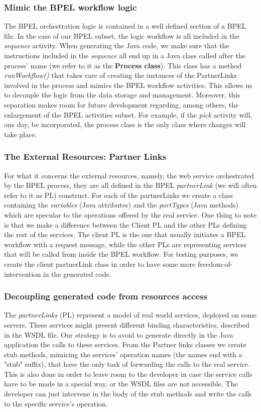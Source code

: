 \subsubsection{Mimic the BPEL workflow logic}
\label{mimicBPELLogic}
The BPEL orchestration logic is contained in a well defined section of a BPEL file. In the case of our BPEL subset, the logic workflow is all included in the \textit{sequence} activity. When generating the Java code, we make sure that the instructions included in the \textit{sequence} all end up in a Java class called after the process' name (we refer to it as the \textbf{Process class}). This class has a method \textit{runWorkflow()} that takes care of creating the instances of the PartnerLinks involved in the process and mimics the BPEL workflow activities.  
This allows us to decouple the logic from the data storage and management. Moreover, this separation makes room for future development regarding, among others, the enlargement of the BPEL activities subset. For example, if the \textit{pick} activity will, one day, be incorporated, the process class is the only class where changes will take place.

\subsubsection{The External Resources: Partner Links}
\label{sec:extrenalResources}
For what it concerns the external resources, namely, the web service orchestrated by the BPEL process, they are all defined in the BPEL \textit{partnerLink} (we will often refer to it as PL) construct. For each of the partnerLinks we create a class containing the \textit{variables} (Java attributes) and the \textit{portTypes} (Java methods) which are specular to the operations offered by the real service. 
One thing to note is that we make a difference between the Client PL and the other PLs defining the rest of the services. The client PL is the one that usually initiates a BPEL workflow with a request message, while the other PLs are representing services that will be called from inside the BPEL workflow. For testing purposes, we create the client partnerLink class in order to have some more freedom-of-intervention in the generated code.

\subsubsection{Decoupling generated code from resources access}
\label{sec:decouplingPL}
The \textit{partnerLinks} (PL) represent a model of real world services, deployed on some servers. These services might present different binding characteristics, described in the WSDL file. Our strategy is to avoid to generate directly in the Java application the calls to these services. From the Partner links classes we create stub methods, mimicing the services' operation names (the names end with a "stub" suffix), that have the only task of forwarding the calls to the real service. 
This is also done in order to leave room to the developer in case the service calls have to be made in a special way, or the WSDL files are not accessible. The developer can just intervene in the body of the stub methods and write the calls to the specific service's operation.

